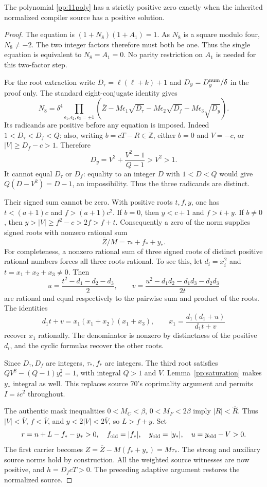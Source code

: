 \begin{theorem}
The polynomial \eqref{pp:11poly} has a strictly positive zero exactly when
the inherited normalized compiler source has a positive solution.
\end{theorem}
\begin{proof}
The equation is $(1+N_8)(1+A_1)=1$. As $N_8$ is a square modulo four,
$N_8\ne-2$. The two integer factors therefore must both be one. Thus the
single equation is equivalent to $N_8=A_1=0$. No parity restriction on
$A_1$ is needed for this two-factor step.

For the root extraction write
$D_\tau=\ell(\ell+k)+1$ and $D_y=D_y^{\rm num}/\delta$ in the proof only.
The standard eight-conjugate identity gives
\[
 N_8=\delta^4\prod_{\epsilon_1,\epsilon_2,\epsilon_3=\pm1}
 \left(\overline Z-M\epsilon_1\sqrt{D_\tau}
                   -M\epsilon_2\sqrt{D_f}-M\epsilon_3\sqrt{D_y}\right).
\]
Its radicands are positive before any equation is imposed. Indeed
$1<D_\tau<D_f<Q$; also, writing $b=cT-R\in\mathbb Z$, either $b=0$
and $V=-c$, or $|V|\ge D_f-c>1$. Therefore
\[
 D_y=V^2+\frac{V^2-1}{Q-1}>V^2>1.
\]
It cannot equal $D_\tau$ or $D_f$: equality to an integer $D$ with
$1<D<Q$ would give $Q(D-V^2)=D-1$, an impossibility. Thus the three
radicands are distinct.

Their signed sum cannot be zero. With positive roots $t,f,y$, one has
$t<(a+1)c$ and $f>(a+1)c^2$. If $b=0$, then $y<c+1$ and $f>t+y$.
If $b\ne0$, then $y>|V|\ge f^2-c>2f>f+t$.
Consequently a zero of the norm supplies signed roots with nonzero
rational sum
\[
 \overline Z/M=\tau_*+f_*+y_*.
\]
For completeness, a nonzero rational sum of three signed roots of
distinct positive rational numbers forces all three roots rational.
To see this, let $d_i=x_i^2$ and $t=x_1+x_2+x_3\ne0$. Then
\[
 u=\frac{t^2-d_1-d_2-d_3}{2},\qquad
 v=\frac{u^2-d_1d_2-d_1d_3-d_2d_3}{2t}
\]
are rational and equal respectively to the pairwise sum and product of
the roots. The identities
\[
 d_1t+v=x_1(x_1+x_2)(x_1+x_3),\qquad
 x_1=\frac{d_1(d_1+u)}{d_1t+v}
\]
recover $x_1$ rationally. The denominator is nonzero by distinctness of
the positive $d_i$, and the cyclic formulas recover the other roots.

Since $D_\tau,D_f$ are integers, $\tau_*,f_*$ are integers. The third
root satisfies $QV^2-(Q-1)y_*^2=1$, with integral $Q>1$ and $V$.
Lemma~\ref{pp:saturation} makes $y_*$ integral as well. This replaces
source 70's coprimality argument and permits $I=ic^2$ throughout.

The authentic mask inequalities $0<M_C<\beta$, $0<M_F<2\beta$ imply
$|R|<\widehat R$. Thus $|V|<\overline V$, $f<\overline V$, and
$y<2|V|<2\overline V$, so $L>f+y$. Set
\[
 r=n+L-f_*-y_*>0,\quad f_{\rm old}=|f_*|,\quad
 y_{\rm old}=|y_*|,\quad u=y_{\rm old}-V>0.
\]
The first carrier becomes $Z=\overline Z-M(f_*+y_*)=M\tau_*$.
The strong and auxiliary source norms hold by construction. All the
weighted source witnesses are now positive, and $h=D_fcT>0$.
The preceding adaptive argument restores the normalized source.


\end{proof}
